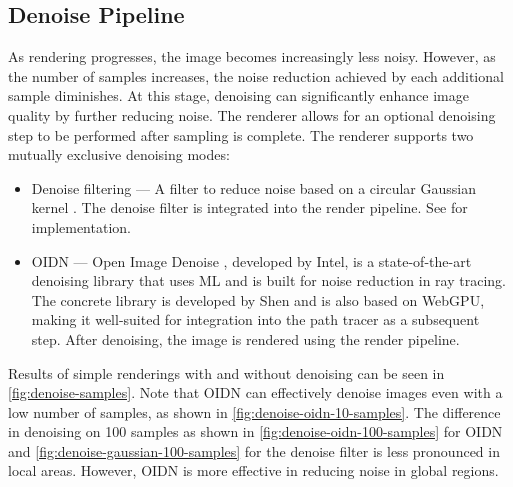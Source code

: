 \subsection*{Denoise Pipeline}

As rendering progresses, the image becomes increasingly less noisy. However, as the number of samples increases, the noise reduction achieved by each additional sample diminishes. At this stage, denoising can significantly enhance image quality by further reducing noise. The renderer allows for an optional denoising step to be performed after sampling is complete. The renderer supports two mutually exclusive denoising modes:

\begin{itemize}
  \item{Denoise filtering} — A filter to reduce noise based on a circular Gaussian kernel \cite{conventionalGaussianDenoise}. The denoise filter is integrated into the render pipeline. See  for implementation.
  \item{\gls{OIDN}} — Open Image Denoise \cite{openImageDenoise}, developed by Intel, is a state-of-the-art denoising library that uses \gls{ML} and is built for noise reduction in ray tracing. The concrete library is developed by Shen \cite{oidnWeb} and is also based on \gls{WebGPU}, making it well-suited for integration into the path tracer as a subsequent step. After denoising, the image is rendered using the render pipeline.
\end{itemize}

Results of simple renderings with and without denoising can be seen in \autoref{fig:denoise-samples}. Note that \gls{OIDN} can effectively denoise images even with a low number of samples, as shown in \autoref{fig:denoise-oidn-10-samples}. The difference in denoising on 100 samples as shown in \autoref{fig:denoise-oidn-100-samples} for \gls{OIDN} and \autoref{fig:denoise-gaussian-100-samples} for the denoise filter is less pronounced in local areas. However, \gls{OIDN} is more effective in reducing noise in global regions.

